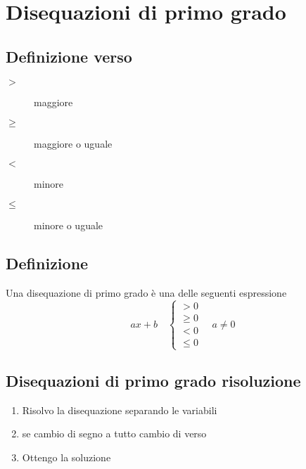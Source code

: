 \chapter{Disequazioni di primo grado}
\section{Definizione verso}
\begin{description}
	\item[$>$] maggiore
	\item[$\geq$] maggiore o uguale
	\item[$<$] minore
	\item[$\leq$] minore o uguale
\end{description}
\section{Definizione}
Una disequazione di primo grado è una delle seguenti espressione
\begin{equation}
ax+b\quad\begin{cases}
>0\\
\geq 0\\
<0\\
\leq 0
\end{cases}\quad a\neq 0
\end{equation}
\section{Disequazioni di primo grado risoluzione}
\begin{enumerate}
	\item Risolvo la disequazione separando le variabili
	\item se cambio di segno a tutto cambio di verso
	\item Ottengo la soluzione
\end{enumerate}